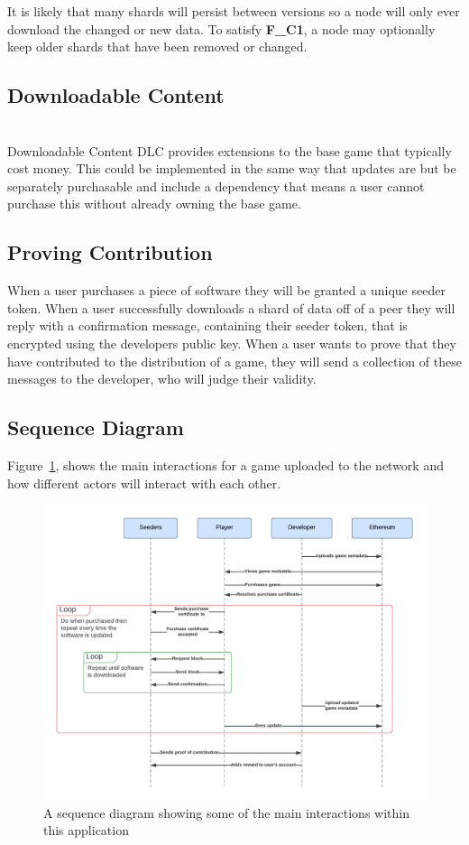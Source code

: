 \noindent It is likely that many shards will persist between versions so a node will only ever download the changed or new data. To satisfy \textbf{F\_C1}, a node may optionally keep older shards that have been removed or changed.

\subsection*{Downloadable Content}
\tbd\\\noindent
Downloadable Content DLC provides extensions to the base game that typically cost money. This could be implemented in the same way that updates are but be separately purchasable and include a dependency that means a user cannot purchase this without already owning the base game.

\subsection*{Proving Contribution}

When a user purchases a piece of software they will be granted a unique seeder token. When a user successfully downloads a shard of data off of a peer they will reply with a confirmation message, containing their seeder token, that is encrypted using the developers public key. 
When a user wants to prove that they have contributed to the distribution of a game, they will send a collection of these messages to the developer, who will judge their validity.

\subsection*{Sequence Diagram}

Figure~\ref{fig:sequence-diagram}, shows the main interactions for a game uploaded to the network and how different actors will interact with each other.

\begin{figure}[ht]
  \centering
  \includegraphics[width=.95\textwidth]{assets/images/diagrams/seqeunce-diagram.png}
  \caption{A sequence diagram showing some of the main interactions within this application}
  \label{fig:sequence-diagram}
\end{figure}